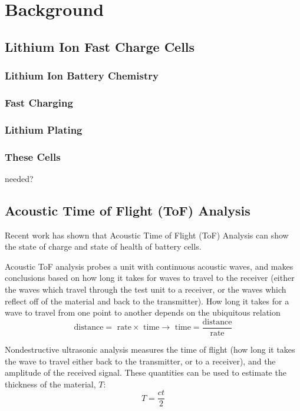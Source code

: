 \chapter{Background}

\section{Lithium Ion Fast Charge Cells}

\subsection{Lithium Ion Battery Chemistry}

\subsection{Fast Charging}

\subsection{Lithium Plating}

\subsection{These Cells}
needed?


\section{Acoustic Time of Flight (ToF) Analysis}
Recent work has shown that Acoustic Time of Flight (ToF) Analysis can show the state of charge and state of health of battery cells.

Acoustic ToF analysis probes a unit with continuous acoustic waves, and makes conclusions based on how long it takes for waves to travel to the receiver (either the waves which travel through the test unit to a receiver, or the waves which reflect off of the material and back to the transmitter). How long it takes for a wave to travel from one point to another depends on the ubiquitous relation 
$$\text{distance} = \text{ rate} \times \text{ time} \rightarrow \text{ time} = \frac{\text{distance}}{\text{rate}}$$

Nondestructive ultrasonic analysis measures the time of flight (how long it takes the wave to travel either back to the transmitter, or to a receiver), and the amplitude of the received signal. These quantities can be used to estimate the thickness of the material, $T$:
$$ T = \frac{ct}{2}$$


